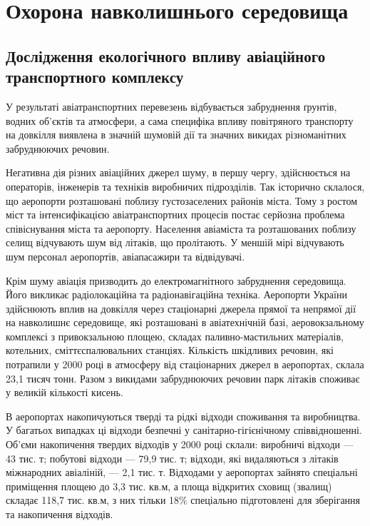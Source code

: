 % 
% 
% 
% 
% 
\section{Охорона навколишнього середовища}
\subsection{Дослідження екологічного впливу авіаційного транспортного комплексу}

У результаті авіатранспортних перевезень відбувається забруднення ґрунтів, водних об’єктів та атмосфери, 
а сама специфіка впливу повітряного транспорту на довкілля виявлена в значній шумовій дії та 
значних викидах різноманітних забруднюючих речовин.

Негативна дія різних авіаційних джерел шуму, в першу чергу, здійснюється на операторів, інженерів 
та техніків виробничих підрозділів. Так історично склалося, що аеропорти розташовані поблизу 
густозаселених районів міста. Тому з ростом міст та інтенсифікацією авіатранспортних процесів 
постає серйозна проблема співіснування міста та аеропорту. Населення авіаміста та розташованих 
поблизу селищ відчувають шум від літаків, що пролітають. У меншій мірі відчувають шум персонал 
аеропортів, авіапасажири та відвідувачі.

Крім шуму авіація призводить до електромагнітного забруднення середовища. Його викликає 
радіолокаційна та радіонавігаційна техніка. Аеропорти України здійснюють вплив на довкілля 
через стаціонарні джерела прямої та непрямої дії на навколишнє середовище, які розташовані в 
авіатехнічній базі, аеровокзальному комплексі з привокзальною площею, складах паливно-мастильних 
матеріалів, котельних, сміттєспалювальних станціях. Кількість шкідливих речовин, які потрапили у 
2000 році в атмосферу від стаціонарних джерел в аеропортах, склала 23,1 тисяч тонн. Разом з викидами 
забруднюючих речовин парк літаків споживає у великій кількості кисень. 

В аеропортах накопичуються тверді та рідкі відходи споживання та виробництва. У багатьох випадках 
ці відходи безпечні у санітарно-гігієнічному співвідношенні. Об’єми накопичення твердих відходів 
у 2000 році склали: виробничі відходи --- 43 тис. т; побутові відходи --- 79,9 тис. т; відходи, 
які видаляються з літаків міжнародних авіаліній, --- 2,1 тис. т. Відходами у аеропортах зайнято 
спеціальні приміщення площею до 3,3 тис. кв.м, а площа відкритих сховищ (звалищ) складає 118,7 тис. кв.м, 
з них тільки 18\% спеціально підготовлені для зберігання та накопичення відходів.

